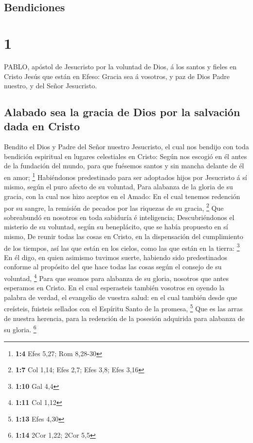 \hypertarget{bendiciones}{%
\subsection{Bendiciones}\label{bendiciones}}

\hypertarget{section}{%
\section{1}\label{section}}

 PABLO, apóstol de Jesucristo por la voluntad de Dios, á los
santos y fieles en Cristo Jesús que están en Efeso:  Gracia
sea á vosotros, y paz de Dios Padre nuestro, y del Señor Jesucristo.

\hypertarget{alabado-sea-la-gracia-de-dios-por-la-salvaciuxf3n-dada-en-cristo}{%
\subsection{Alabado sea la gracia de Dios por la salvación dada en
Cristo}\label{alabado-sea-la-gracia-de-dios-por-la-salvaciuxf3n-dada-en-cristo}}

 Bendito el Dios y Padre del Señor nuestro Jesucristo, el
cual nos bendijo con toda bendición espiritual en lugares celestiales en
Cristo:  Según nos escogió en él antes de la fundación del
mundo, para que fuésemos santos y sin mancha delante de él en amor;
\footnote{\textbf{1:4} Efes 5,27; Rom 8,28-30}  Habiéndonos
predestinado para ser adoptados hijos por Jesucristo á sí mismo, según
el puro afecto de su voluntad,  Para alabanza de la gloria
de su gracia, con la cual nos hizo aceptos en el Amado:  En
el cual tenemos redención por su sangre, la remisión de pecados por las
riquezas de su gracia, \footnote{\textbf{1:7} Col 1,14; Efes 2,7; Efes
  3,8; Efes 3,16}  Que sobreabundó en nosotros en toda
sabiduría é inteligencia;  Descubriéndonos el misterio de su
voluntad, según su beneplácito, que se había propuesto en sí mismo,
 De reunir todas las cosas en Cristo, en la dispensación
del cumplimiento de los tiempos, así las que están en los cielos, como
las que están en la tierra: \footnote{\textbf{1:10} Gal 4,4}
 En él digo, en quien asimismo tuvimos suerte, habiendo
sido predestinados conforme al propósito del que hace todas las cosas
según el consejo de su voluntad, \footnote{\textbf{1:11} Col 1,12}
 Para que seamos para alabanza de su gloria, nosotros que
antes esperamos en Cristo.  En el cual esperasteis también
vosotros en oyendo la palabra de verdad, el evangelio de vuestra salud:
en el cual también desde que creísteis, fuisteis sellados con el
Espíritu Santo de la promesa, \footnote{\textbf{1:13} Efes 4,30}
 Que es las arras de nuestra herencia, para la redención de
la posesión adquirida para alabanza de su gloria. \footnote{\textbf{1:14}
  2Cor 1,22; 2Cor 5,5}

